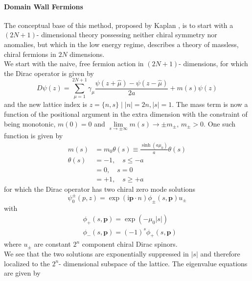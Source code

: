 \documentclass[a4paper,10pt]{book}
\begin{document}
\paragraph{Domain Wall Fermions}
The conceptual base of this method, proposed by Kaplan \cite{KaplanDavidB1992Amfs}, is to start with a $(2N+1)$- dimensional theory possessing neither chiral symmetry nor anomalies, but which in the low energy regime, describes a theory of massless, chiral fermions in $2N$ dimensions.\\We start with the naive, free fermion action in $(2N+1)$- dimensions, for which the Dirac operator is given by
\begin{equation}
D\psi(z)=\sum_{\mu=1}^{2N+1} \gamma_{\mu} \frac{\psi(z+\hat{\mu})- \psi(z-\hat{\mu})}{2 a}+m(s) \psi(z)
\end{equation}
and the new lattice index is $z = \{n,s\}\mid |n| =2n, |s|=1$. The mass term is now a function of the positional argument in the extra dimension with the constraint of being monotonic, $m(0)=0$ and $\lim\limits_{s \to \pm \infty}m(s)\rightarrow \pm m_\pm,\,m_\pm > 0$. One such function is given by
\begin{equation}
\begin{aligned}
m(s) &=m_{0} \theta(s) \equiv \frac{\sinh \left(a \mu_{0}\right)}{a} \theta(s) \\
\theta(s) &=-1, \quad s \leq-a \\
&=0, \quad s=0 \\
&=+1, \quad s \geq+a
\end{aligned}
\end{equation}
for which the Dirac operator has two chiral zero mode solutions
\begin{equation}
\psi_{0}^{\pm}(p, z)=\exp (\mathrm{i} \boldsymbol{p} \cdot n) \phi_{\pm}(s, \boldsymbol{p}) u_{\pm}
\end{equation}
with
\begin{equation}
\begin{aligned}
&\phi_{+}(s, \boldsymbol{p})=\exp \left(-\mu_{0}|s|\right) \\
&\phi_{-}(s, \boldsymbol{p})=(-1)^{s} \phi_{+}(s, \boldsymbol{p})
\end{aligned}
\end{equation}
where $u_\pm$ are constant $2^n$ component chiral Dirac spinors.\\We see that the two solutions are exponentially suppressed in $|s|$ and therefore localized to the $2^n$- dimensional subspace of the lattice. The eigenvalue equations are given by
\end{document}
